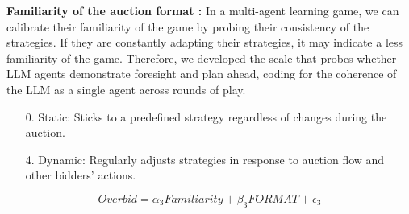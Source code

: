 \documentclass{article} %
\begin{document}
\textbf{Familiarity of the auction format :}
In a multi-agent learning game, we can calibrate their familiarity of the game by probing their consistency of the strategies.
If they are constantly adapting their strategies, it may indicate a less familiarity of the game.
Therefore, we developed the scale that probes whether LLM agents demonstrate foresight and plan ahead, coding for the coherence of the LLM as a single agent across rounds of play.

\begin{enumerate}
    \item[0.] Static: Sticks to a predefined strategy regardless of changes during the auction.
    \item[4.] Dynamic: Regularly adjusts strategies in response to auction flow and other bidders’ actions.
\end{enumerate}

\begin{equation}
    Overbid = \alpha_3 Familiarity + \beta_3 FORMAT + \epsilon_3
\end{equation}







\end{document}
